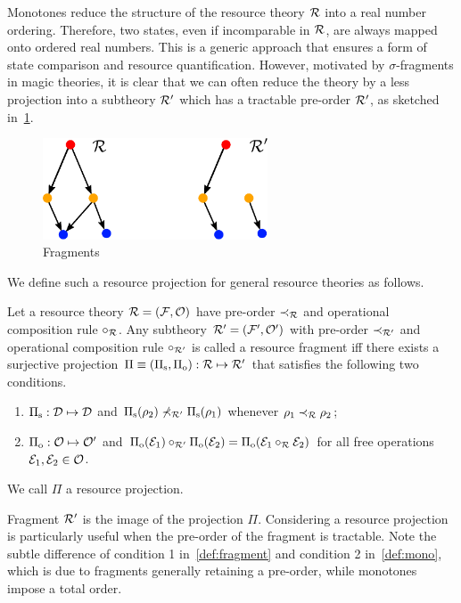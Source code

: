 \documentclass[pra,
aps,
twocolumn,
superscriptaddress,
groupedaddress,
nofootinbib,
reprint
]{revtex4-1}
\begin{document}
Monotones reduce the structure of the resource theory $\mathcal{R}$ into a real number ordering.
Therefore, two states, even if incomparable in $\mathcal{R}$, are always mapped onto ordered real numbers.
This is a generic approach that ensures a form of state comparison and resource quantification.
However, motivated by $\sigma$-fragments in magic theories, it is clear that we can often reduce the theory by a less  projection into a subtheory $\mathcal{R}'$ which has a tractable pre-order $\mathcal{R}'$, as sketched in~\cref{fig:fragments}.
\begin{figure}[t]
    \centering
    \includegraphics[height=3cm]{figs/fragments.pdf}
    \caption{Fragments 
    }
    \label{fig:fragments}
\end{figure}
We define such a resource projection for general resource theories as follows.
\begin{definition}\label{def:fragment}
    Let a resource theory $\mathcal{R} = (\mathcal{F}, \mathcal{O})$ have pre-order $\prec_{\mathcal{R}}$ and operational composition rule $\circ_{\mathcal{R}}$. 
    Any subtheory $\mathcal{R}' = (\mathcal{F}', \mathcal{O}')$ with pre-order $\prec_{\mathcal{R}'}$ and operational composition rule $\circ_{\mathcal{R}'}$ is called a resource fragment iff there exists a surjective projection $\Pi \equiv (\Pi_{\rm{s}}, \Pi_{\rm{o}}): \mathcal{R} \mapsto \mathcal{R}'$ that satisfies the following two conditions.
    \begin{enumerate}
        \item $\Pi_{\rm{s}}: \mathcal{D} \mapsto \mathcal{D}$ and $\Pi_{\rm{s}}(\rho_2) \nprec_{\mathcal{R}'} \Pi_{\rm{s}}(\rho_1)$ whenever $\rho_1 \prec_{\mathcal{R}} \rho_2$;
        \item $\Pi_{\rm{o}}: \mathcal{O} \mapsto \mathcal{O}'$ and $\Pi_{\rm{o}}(\mathcal{E}_1) \circ_{\mathcal{R}'} \Pi_{\rm{o}}(\mathcal{E}_2) = \Pi_{\rm{o}}(\mathcal{E}_1 \circ_{\mathcal{R}} \mathcal{E}_2)$ for all free operations $\mathcal{E}_1, \mathcal{E}_2 \in \mathcal{O}$.
    \end{enumerate}
    We call $\Pi$ a resource projection.
\end{definition}
Fragment $\mathcal{R}'$ is the image of the projection $\Pi$.
Considering a resource projection is particularly useful when the pre-order of the fragment is tractable.
Note the subtle difference of condition 1 in~\cref{def:fragment} and condition 2 in~\cref{def:mono}, which is due to fragments generally retaining a pre-order, while monotones impose a total order.
\end{document}
